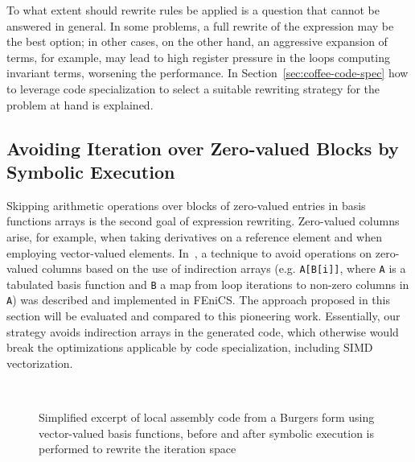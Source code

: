 To what extent should rewrite rules be applied is a question that cannot be answered in general. In some problems, a full rewrite of the expression may be the best option; in other cases, on the other hand, an aggressive expansion of terms, for example, may lead to high register pressure in the loops computing invariant terms, worsening the performance. In Section~\ref{sec:coffee-code-spec} how to leverage code specialization to select a suitable rewriting strategy for the problem at hand is explained.

\subsection{Avoiding Iteration over Zero-valued Blocks by Symbolic Execution}
\label{sec:coffee-avoidzeros}
Skipping arithmetic operations over blocks of zero-valued entries in basis functions arrays is the second goal of expression rewriting. Zero-valued columns arise, for example, when taking derivatives on a reference element and when employing vector-valued elements. In~\cite{quadrature-olegaard}, a technique to avoid operations on zero-valued columns based on the use of indirection arrays (e.g. \texttt{A[B[i]]}, where \texttt{A} is a tabulated basis function and \texttt{B} a map from loop iterations to non-zero columns in \texttt{A}) was described and implemented in FEniCS. The approach proposed in this section will be evaluated and compared to this pioneering work. Essentially, our strategy avoids indirection arrays in the generated code, which otherwise would break the optimizations applicable by code specialization, including SIMD vectorization. 

\begin{figure}[t]
\tiny
\centerline{
~~~~~~~~~
}
\caption{Simplified excerpt of local assembly code from a Burgers form using vector-valued basis functions, before and after symbolic execution is performed to rewrite the iteration space}\label{fig:skip-code}
\end{figure}

